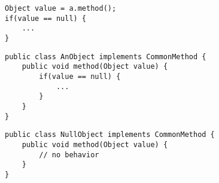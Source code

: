 
















\begin{lstlisting}[label=listing:nullobject1,caption={Null check, implemented by using a conditional}]
Object value = a.method();
if(value == null) {
	...
}
\end{lstlisting}

\begin{lstlisting}[label=listing:nullobject2,caption={Object implementing the behavior}]
public class AnObject implements CommonMethod {
	public void method(Object value) {
		if(value == null) {
			...
		}
	}
}
\end{lstlisting}

\begin{lstlisting}[label=listing:nullobject3,caption={Null object implementing no behavior}]
public class NullObject implements CommonMethod {
	public void method(Object value) {
		// no behavior
	}
}
\end{lstlisting}

